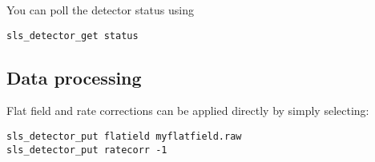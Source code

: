 \documentclass{article}
\begin{document}
You can poll the detector status using
\begin{verbatim}
sls_detector_get status 
\end{verbatim}


\subsection{Data processing}
Flat field and rate corrections can be applied directly by simply selecting:
\begin{verbatim}
sls_detector_put flatield myflatfield.raw
sls_detector_put ratecorr -1
\end{verbatim}
\end{document}
